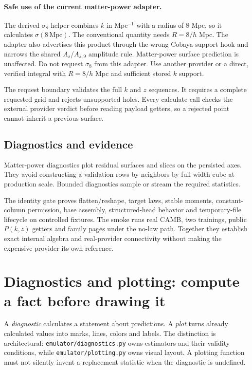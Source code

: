 \documentclass[10pt,aps,prd,twocolumn,nofootinbib]{revtex4-2}
\newcommand{\code}[1]{\texttt{#1}}
\begin{document}
\paragraph{Safe use of the current matter-power adapter.}
The derived \(\sigma_8\) helper combines \(k\) in Mpc\(^{-1}\) with a radius
of 8 Mpc, so it calculates \(\sigma(8\,\mathrm{Mpc})\).  The conventional
quantity needs \(R=8/h\) Mpc.  The adapter also advertises this product through
the wrong Cobaya support hook and narrows the shared \(A_s\)/\(A_{s,9}\)
amplitude rule.  Matter-power surface prediction is unaffected.  Do not
request \(\sigma_8\) from this adapter.  Use another provider or a direct,
verified integral with \(R=8/h\) Mpc and sufficient stored \(k\) support.

The request boundary validates the full \(k\) and \(z\) sequences.  It requires
a complete requested grid and rejects unsupported holes.  Every calculate
call checks the external provider verdict
before reading payload getters, so a rejected point cannot inherit a previous
surface.

\subsection{Diagnostics and evidence}

Matter-power diagnostics plot residual surfaces and slices on the persisted
axes.  They avoid constructing a validation-rows by neighbors by full-width
cube at production scale.  Bounded diagnostics sample or stream the required
statistics.

The identity gate proves flatten/reshape, target laws, stable moments,
constant-column permission, base assembly, structured-head behavior and
temporary-file lifecycle on controlled fixtures.  The smoke runs real CAMB,
two trainings, public \(P(k,z)\) getters and family pages under the no-law
path.  Together they establish exact internal algebra and real-provider
connectivity without making the expensive provider its own reference.

\section{Diagnostics and plotting: compute a fact before drawing it}
\label{chap:diagnostics}

A \emph{diagnostic} calculates a statement about predictions.  A \emph{plot}
turns already calculated values into marks, lines, colors and labels.  The
distinction is architectural: \code{emulator/diagnostics.py} owns estimators
and their validity conditions, while \code{emulator/plotting.py} owns visual
layout.  A plotting function must not silently invent a replacement statistic
when the diagnostic is undefined.
\end{document}

